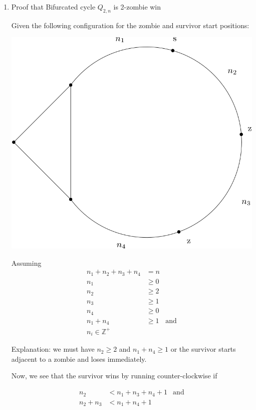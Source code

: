\documentclass[letterpaper, 10pt]{article}
\newcommand{\Z}{\mathbb{Z}}
\begin{document}
\begin{enumerate}

\item Proof that Bifurcated cycle $Q_{2,n}$ is 2-zombie win

Given the following configuration for the zombie and survivor start positions:

\begin{center}
  \includegraphics[scale=0.25]{bifurcated_cycle_2_n_type_A.png}
\end{center}

Assuming
\begin{align*}
  n_1 + n_2 + n_3 + n_4 &= n \\
  n_1 &\geq 0 \\
  n_2 &\geq 2 \\
  n_3 &\geq 1 \\
  n_4 &\geq 0 \\
  n_1 + n_4 &\geq 1 & \text{and}\\
  n_i \in \Z^{+}
\end{align*}

Explanation: we must have $n_2 \geq 2$ and $n_1 + n_4 \geq 1$ or the survivor starts adjacent to a zombie and
loses immediately.

Now, we see that the survivor wins by running counter-clockwise if

\begin{align*}
  n_2 & < n_1 + n_3 + n_4 + 1 & \text{and}\\
  n_2 + n_3 & < n_1 + n_4 + 1
\end{align*}


\end{enumerate}
\end{document}
